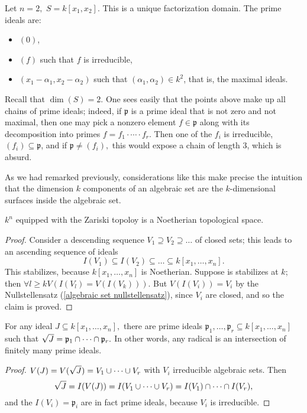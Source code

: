 \begin{example}
  Let \(n=2,\) \(S = k[x_1, x_2].\)
  This is a unique factorization domain. The prime ideals are:
  \begin{itemize}
  \item \((0)\),
  \item \((f)\) such that \(f\) is irreducible,
  \item \((x_1 - \alpha_1, x_2 - \alpha_2)\) such that \((\alpha_1, \alpha_2) \in k^2\), that is, the maximal ideals.
  \end{itemize}
  Recall that \(\dim(S) = 2.\) One sees easily that the points above make up all chains of prime ideals; indeed, if \(\mathfrak p\) is a prime ideal that is not zero and not maximal, then one may pick a nonzero element \(f \in \mathfrak p\) along with its decomposition into primes \(f = f_1 \cdot \dotsm \cdot f_r\). Then one of the \(f_i\) is irreducible, \((f_i) \subseteq \mathfrak p\), and if \(\mathfrak p \neq (f_i),\) this would expose a chain of length \(3\), which is absurd.

  As we had remarked previously, considerations like this make precise the intuition that the dimension \(k\) components of an algebraic set are the \(k\)-dimensional surfaces inside the algebraic set.
\end{example}

\begin{lemma}
  \(k^n\) equipped with the Zariski topoloy is a Noetherian topological space.
\end{lemma}
\begin{proof}
  Consider a descending sequence \(V_1 \supseteq V_2 \supseteq \dotso\) of closed sets; this leads to an ascending sequence of ideals
  \[I(V_1) \subseteq I(V_2) \subseteq \dotso \subseteq k[x_1, \dotsc, x_n].\]
  This stabilizes, because \(k[x_1, \dotsc, x_n]\) is Noetherian. Suppose is stabilizes at \(k\); then
  \(\forall l \geq k V(I(V_l) = V(I(V_k))).\)
  But \(V(I(V_i)) = V_i\) by the Nullstellensatz (\cref{algebraic set nullstellensatz}), since \(V_i\) are closed,
  and so the claim is proved.
\end{proof}

\begin{corollary}
  For any ideal \(J \subseteq k[x_1, \dotsc, x_n],\) there are prime ideals
  \(\mathfrak p_1, \dotsc, \mathfrak p_r \subseteq k[x_1, \dotsc, x_n]\)
  such that
  \(\sqrt{J} = \mathfrak p_1 \cap \dotsb \cap \mathfrak p_r.\)
  In other words, any radical is an intersection of finitely many prime ideals.
\end{corollary}
\begin{proof}
  \(V(J) = V(\sqrt{J}) = V_1 \cup \dotsb \cup V_r\) with \(V_i\) irreducible algebraic sets. Then
  \[\sqrt{J} = I(V(J)) = I(V_1 \cup \dotsb \cup V_r) = I(V_1) \cap \dotsb \cap I(V_r),\]
  and the \(I(V_i) = \mathfrak p_i\) are in fact prime ideals, because \(V_i\) is irreducible.
\end{proof}






